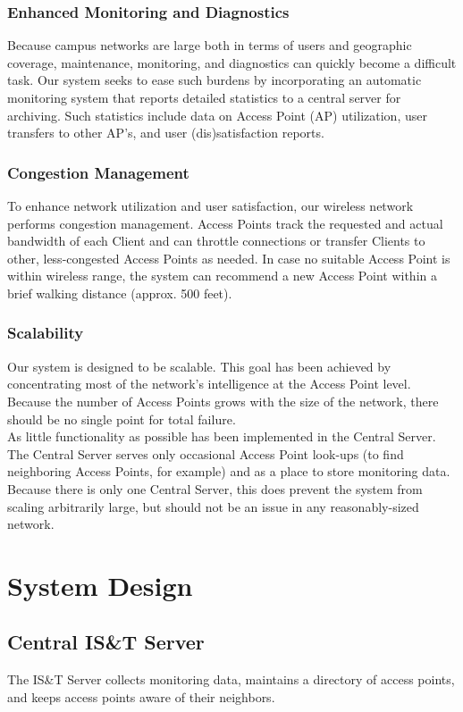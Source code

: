 \documentclass[11pt,twocolumn]{article}
\begin{document}
\subsubsection{Enhanced Monitoring and Diagnostics}
\indent Because campus networks are large both in terms of users and geographic coverage, maintenance, monitoring, and diagnostics can quickly become a
difficult task. Our system seeks to ease such burdens by incorporating an automatic monitoring system that reports detailed statistics to a central
server for archiving. Such statistics include data on Access Point (AP) utilization, user transfers to other AP's, and user (dis)satisfaction reports.
\subsubsection{Congestion Management}
\indent To enhance network utilization and user satisfaction, our wireless network performs congestion management. Access Points track the requested
and actual bandwidth of each Client and can throttle connections or transfer Clients to other, less-congested Access Points as needed. In case no
suitable Access Point is within wireless range, the system can recommend a new Access Point within a brief walking distance (approx. 500 feet).
\subsubsection{Scalability}
\indent Our system is designed to be scalable. This goal has been achieved by concentrating most of the network's intelligence at the Access Point
level. Because the number of Access Points grows with the size of the network, there should be no single point for total failure. \\
\indent As little functionality as possible has been implemented in the Central Server. The Central Server serves only occasional Access Point look-ups (to
find neighboring Access Points, for example) and as a place to store monitoring data. Because there is only one Central Server, this does prevent the 
system from scaling arbitrarily large, but should not be an issue in any reasonably-sized network. 

\section{System Design}

\subsection{Central IS\&T Server}
\indent The IS\&T Server collects monitoring data, maintains a directory of access points, and keeps access points aware of their neighbors.
\end{document}
